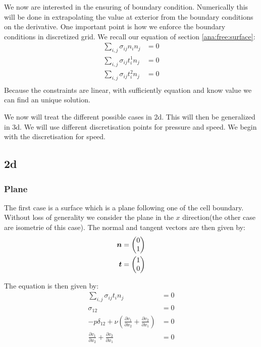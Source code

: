We now are interested in the ensuring of boundary condition.
Numerically this will be done in extrapolating the value at exterior from the boundary conditions on the derivative.
One important point is how we enforce the boundary conditions in discretized grid.
We recall our equation of section \ref{ana:free:surface}:
\begin{align}
	\sum_{i,j}\sigma_{ij}n_{i}n_{j}&=0\\
	\sum_{i,j}\sigma_{ij}t^{1}_{i}n_{j}&=0\\
	\sum_{i,j}\sigma_{ij}t^{2}_{i}n_{j}&=0\\
\end{align}
Because the constraints are linear, with sufficiently equation and know value we can find an unique solution.

We now will treat the different possible cases in 2d. This will then be generalized in 3d.
We will use different discretisation points for pressure and speed.
We begin with the discretisation for speed.

\subsection{2d}
\label{topo:extrap:2d}
\subsubsection{Plane}

The first case is a surface which is a plane following one of the cell boundary.
Without loss of generality we consider the plane in the $x$ direction(the other case are isometrie of this case).
The normal and tangent vectors are then given by:
\begin{align}
	{\boldsymbol {n}}&=\begin{pmatrix}
			0\\
			1
		\end{pmatrix}\\
	{\boldsymbol {t}}&=\begin{pmatrix}
			1\\
			0
		\end{pmatrix}
\end{align}

The equation is then given by:
\begin{align}
	\sum_{i,j}\sigma_{ij}t_{i}n_{j}&=0\\
	\sigma_{12}&=0\\
	-p \delta_{12}+\nu\left(\frac{\partial v_{1}}{\partial x_{2}}+\frac{\partial v_{2}}{\partial x_{1}}\right)&=0\\
	\frac{\partial v_{1}}{\partial x_{2}}+\frac{\partial v_{2}}{\partial x_{1}}&=0\\
\end{align}

